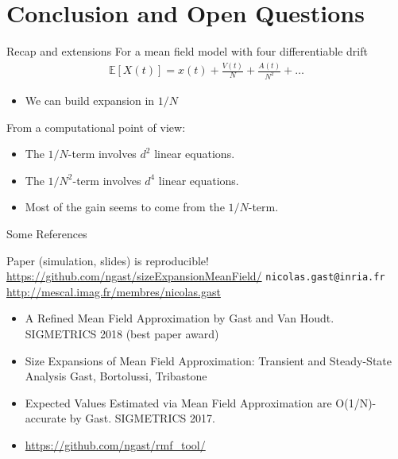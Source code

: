 \documentclass{beamer}
\newcommand\esp[1]{\mathbb{E}\left[#1\right]}
\newcommand\blue[1]{{\color{blue}#1}}
\begin{document}
\section{Conclusion and Open Questions}

\begin{frame}{Recap and extensions}
  For a mean field model with four differentiable drift
  \begin{align*}
    \esp{X(t)} = x(t) + \frac{V(t)}{N} + \frac{A(t)}{N^2}+ \dots 
  \end{align*}
  \begin{itemize}
  \item We can build expansion in $1/N$ 
  \end{itemize}
  \bigskip
  From a computational point of view:
  \begin{itemize}
  \item The $1/N$-term involves $d^2$ linear equations.
  \item The $1/N^2$-term involves $d^4$ linear equations.
  \item Most of the gain seems to come from the $1/N$-term. 
  \end{itemize}
\end{frame}

\begin{frame}{Some References}

  
  \begin{center}
    Paper (simulation, slides) is reproducible!
    \url{https://github.com/ngast/sizeExpansionMeanField/}
    \vspace{1cm}
    \texttt{nicolas.gast@inria.fr}\\ \bigskip
    \url{http://mescal.imag.fr/membres/nicolas.gast}
  \end{center}

  \bigskip
  
  \begin{itemize}
      \item \tiny \blue{A Refined Mean Field Approximation} by Gast
        and Van Houdt. SIGMETRICS 2018 (best paper award)
      \item \blue{Size Expansions of Mean Field Approximation:
          Transient and Steady-State Analysis} Gast, Bortolussi,
        Tribastone
      \item \blue{Expected Values Estimated via Mean Field Approximation
          are O(1/N)-accurate} by Gast. SIGMETRICS 2017.
      \item \url{https://github.com/ngast/rmf_tool/}
      \end{itemize}
    \end{frame}
\end{document}
